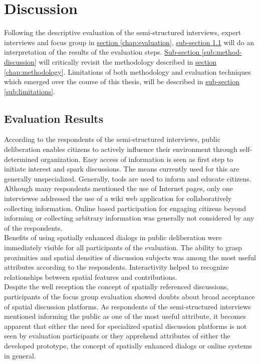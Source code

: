 \section{Discussion}
\label{chap:discussion}
Following the descriptive evaluation of the semi-structured interviews, expert interviews and focus group in \hyperref[chap:evaluation]{section \ref{chap:evaluation}}, \hyperref[sub:evaluation-results]{sub-section \ref{sub:evaluation-results}} will do an interpretation of the results of the evaluation steps. \hyperref[sub:method-discussion]{Sub-section \ref{sub:method-discussion}} will critically revisit the methodology described in \hyperref[chap:methodology]{section \ref{chap:methodology}}. Limitations of both methodology and evaluation techniques which emerged over the course of this thesis, will be described in \hyperref[sub:limitations]{sub-section \ref{sub:limitations}}.

\subsection{Evaluation Results}
\label{sub:evaluation-results}
According to the respondents of the semi-structured interviews, public deliberation enables citizens to actively influence their environment through self-determined organization. Easy access of information is seen as first step to initiate interest and spark discussions. The means currently used for this are generally unspecialized. Generally, tools are used to inform and educate citizens. Although many respondents mentioned the use of Internet pages, only one interviewee addressed the use of a wiki web application for collaboratively collecting information. Online based participation for engaging citizens beyond informing or collecting arbitrary information was generally not considered by any of the respondents.\\
Benefits of using spatially enhanced dialogs in public deliberation were immediately visible for all participants of the evaluation. The ability to grasp proximities and spatial densities of discussion subjects was among the most useful attributes according to the respondents. Interactivity helped to recognize relationships between spatial features and contributions.\\
Despite the well reception the concept of spatially referenced discussions, participants of the focus group evaluation showed doubts about broad acceptance of spatial discussion platforms. As respondents of the semi-structured interviews mentioned informing the public as one of the most useful attribute, it becomes apparent that either the need for specialized spatial discussion platforms is not seen by evaluation participants or they apprehend attributes of either the developed prototype, the concept of spatially enhanced dialogs or online systems in general. 

